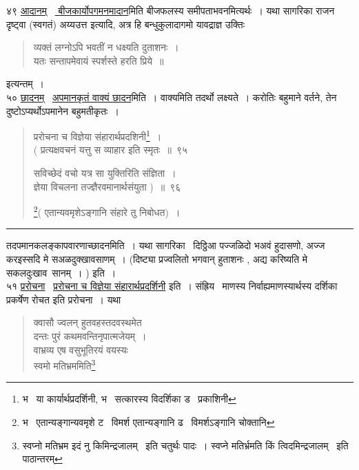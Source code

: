 \documentclass[11pt, openany]{book}
\begin{document}
४९ \underline{आदानम्} \textendash\ \underline{ बीजकार्योपगमनमादान}मिति बीजफलस्य समीपताभवनमित्यर्थः~। यथा सागरिका राजन दृष्ट्वा (स्वगतं) {\qt अय्यउत्त} इत्यादि, अत्र हि बन्धुकुलादागमो यावद्राज्ञ उक्तिः \textendash

\begin{quote}
{\qt व्यक्तं लग्नोऽपि भवतीं न धक्ष्यति दुताशनः~।\\
यतः सन्तापमेवायं स्पर्शस्ते हरति प्रिये~॥}
\end{quote}

\noindent
इत्यन्तम्~।\\

५० \underline{छादनम्} \textendash\ \underline{अपमानकृतं वाक्यं छादन}मिति~। वाक्यमिति तदर्थो लक्ष्यते~। करोतिः बहुमाने वर्तने, तेन दुष्टोऽप्यर्थोऽपमानेन बहुमतीकृतः~।

\newpage

\begin{quote}
{\na प्ररोचना च विज्ञेया संहारार्थप्रदशिनी\renewcommand{\thefootnote}{1}\footnote{भ \textendash\ या कार्यार्थप्रदर्शिनी, भ \textendash\ सत्कारस्य विदर्शिका ड \textendash\ प्रकाशिनी}~।\\
( प्रत्यक्षवचनं यत्तु स व्याहार इति स्मृतः~॥~९५

सविच्छेदं वचो यत्र सा युक्तिरिति संज्ञिता~।\\
ज्ञेया विचलना तज्ज्ञैरवमानार्थसंयुता )~॥~९६

\renewcommand{\thefootnote}{2}\footnote{भ \textendash\ एतान्यङ्गान्यवमृशे ट \textendash\ विमर्श एतान्यङ्गानि ढ \textendash\ विमर्शऽङ्गानि चोक्तानि}( एतान्यवमृशेऽङ्गानि संहारे तु निबोधत)~।}
\end{quote}

\hrule

\vspace{2mm}
\noindent
तदपमानकलङ्कापवारणाच्छादनमिति~। यथा सागरिका \textendash\ दिठ्ठिआ पज्जळिदो भअवं हुदासणो, अज्ज करइस्सदि मे सअळदुक्खावसाणम्~। (दिष्ट्या प्रज्वलितो भगवान् हुताशनः , अद्य करिष्यति मे सकलदुःखाव\textendash\ 
सानम्~। ) इति~।\\

५१ \underline{प्ररोचना} \textendash\ \underline{प्ररोचना च विज्ञेया संहारार्थप्रदर्शिनी} इति~। संह्रिय \textendash\ माणस्य निर्वाह्यमाणस्यार्थस्य दर्शिका प्रकर्षेण रोचत इति प्ररोचना~। यथा \textendash

\begin{quote}
{\qt क्वासौ ज्वलन् हुतवहस्तदवस्थमेत\\
दन्तः पुरं कथमवन्तिनृपात्मजेयम्~।\\
वाभ्रव्य एष वसुभूतिरयं वयस्यः\\
स्वमो मतिभ्रममिति\renewcommand{\thefootnote}{*}\footnote{स्वप्नो मतिभ्रम इदं नु किमिन्द्रजालम् \textendash\ इति चतुर्थः पादः~। स्वप्ने मतिर्भ्रमति किं त्विदमिन्द्रजालम् \textendash\ इति पाठान्तरम्}}
\end{quote}
\end{document}
